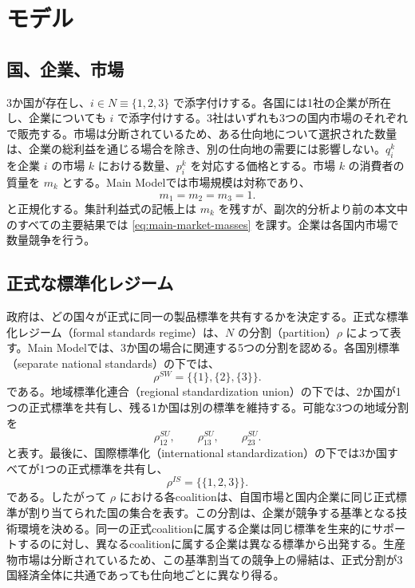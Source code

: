 \section{モデル}
\label{sec:model}

\subsection{国、企業、市場}
\label{subsec:model-countries}

3か国が存在し、$i\in N\equiv\{1,2,3\}$ で添字付けする。各国には1社の企業が所在し、企業についても $i$ で添字付けする。3社はいずれも3つの国内市場のそれぞれで販売する。市場は分断されているため、ある仕向地について選択された数量は、企業の総利益を通じる場合を除き、別の仕向地の需要には影響しない。$q_i^k$ を企業 $i$ の市場 $k$ における数量、$p_i^k$ を対応する価格とする。市場 $k$ の消費者の質量を $m_k$ とする。Main Modelでは市場規模は対称であり、
\begin{equation}
    m_1=m_2=m_3=1.
    \label{eq:main-market-masses}
\end{equation}
と正規化する。集計利益式の記帳上は $m_k$ を残すが、副次的分析より前の本文中のすべての主要結果では \eqref{eq:main-market-masses} を課す。企業は各国内市場で数量競争を行う。

\subsection{正式な標準化レジーム}
\label{subsec:model-formal-standards}

政府は、どの国々が正式に同一の製品標準を共有するかを決定する。正式な標準化レジーム（formal standards regime）は、$N$ の分割（partition）$\rho$ によって表す。Main Modelでは、3か国の場合に関連する5つの分割を認める。各国別標準（separate national standards）の下では、
\begin{equation}
    \rho^{SW}=\bigl\{\{1\},\{2\},\{3\}\bigr\}.
    \label{eq:partition-sw}
\end{equation}
である。地域標準化連合（regional standardization union）の下では、2か国が1つの正式標準を共有し、残る1か国は別の標準を維持する。可能な3つの地域分割を
\begin{equation}
    \rho_{12}^{SU},\qquad
    \rho_{13}^{SU},\qquad
    \rho_{23}^{SU}.
    \label{eq:partition-su}
\end{equation}
と表す。最後に、国際標準化（international standardization）の下では3か国すべてが1つの正式標準を共有し、
\begin{equation}
    \rho^{IS}=\bigl\{\{1,2,3\}\bigr\}.
    \label{eq:partition-is}
\end{equation}
である。したがって $\rho$ における各coalitionは、自国市場と国内企業に同じ正式標準が割り当てられた国の集合を表す。この分割は、企業が競争する基準となる技術環境を決める。同一の正式coalitionに属する企業は同じ標準を生来的にサポートするのに対し、異なるcoalitionに属する企業は異なる標準から出発する。生産物市場は分断されているため、この基準割当ての競争上の帰結は、正式分割が3国経済全体に共通であっても仕向地ごとに異なり得る。

